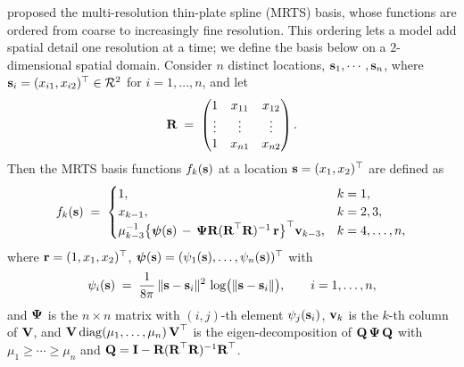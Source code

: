 \documentclass[12pt]{article}
\begin{document}
\textcite{tzeng_resolution_2018} proposed the multi-resolution thin-plate spline (MRTS) basis, whose functions are ordered from coarse to increasingly fine resolution. This ordering lets a model add spatial detail one resolution at a time; we define the basis below on a $2$-dimensional spatial domain. Consider $n$ distinct locations, $\mbox{\bf s}_1, \cdots, \mbox{\bf s}_n$, where $\mbox{\bf s}_i = (x_{i1}, x_{i2})^\top \in {\cal R}^2$ for $i = 1, \ldots, n$, and let
\begin{equation}
  \mbox{\bf R} \;=\;
  \begin{pmatrix}
    1 & x_{11} & x_{12} \\
    \vdots & \vdots & \vdots \\
    1 & x_{n1} & x_{n2}
  \end{pmatrix}.
  \label{eq:mrts-X}
\end{equation}
Then the MRTS basis functions $f_k(\mbox{\bf s})$ at a location $\mbox{\bf s} = (x_1, x_2)^\top$ are defined as
\begin{equation}
  f_k(\mbox{\bf s}) \;=\;
  \begin{cases}
    1, & k = 1, \\
    x_{k-1}, & k = 2, 3, \\
    \mu_{k-3}^{-1} \big\{ \mbox{\boldmath $\psi$}(\mbox{\bf s}) \,-\, \mbox{\boldmath $\Psi$} \mbox{\bf R}( \mbox{\bf R}^\top \mbox{\bf R} )^{-1} \, \mbox{\bf r} \big\}^\top \mbox{\bf v}_{k-3}, & k = 4, \ldots, n,
  \end{cases}
  \label{eq:mrts-basis}
\end{equation}
where $\mbox{\bf r} = (1, x_1, x_2)^\top$, $\mbox{\boldmath $\psi$}(\mbox{\bf s}) = (\psi_1(\mbox{\bf s}), \ldots, \psi_n(\mbox{\bf s}))^\top$ with
\begin{equation}
  \psi_i(\mbox{\bf s}) \;=\; \frac{1}{8\pi}\,\|\mbox{\bf s} - \mbox{\bf s}_i\|^2 \, \log\!\big(\|\mbox{\bf s} - \mbox{\bf s}_i\|\big), \qquad i = 1, \ldots, n,
  \label{eq:tps-kernel}
\end{equation}
and $\mbox{\boldmath $\Psi$}$ is the $n \times n$ matrix with $(i,j)$-th element $\psi_j(\mbox{\bf s}_i)$, $\mbox{\bf v}_k$ is the $k$-th column of $\mbox{\bf V}$, and $\mbox{\bf V}\,\mathrm{diag}(\mu_1, \ldots, \mu_n)\,\mbox{\bf V}^\top$ is the eigen-decomposition of $\mbox{\bf Q}\,\mbox{\boldmath $\Psi$}\,\mbox{\bf Q}$ with $\mu_1 \ge \cdots \ge \mu_n$ and $\mbox{\bf Q} = \mbox{\bf I} - \mbox{\bf R}(\mbox{\bf R}^\top \mbox{\bf R})^{-1} \mbox{\bf R}^\top$.
\end{document}

